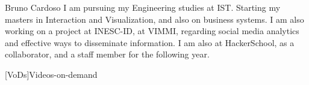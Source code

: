 \documentclass[a4paper,12pt,journal,twoside,compsoc]{PPIEEEtran}
\begin{document}
\begin{IEEEbiography}{Bruno Cardoso}
I am pursuing my Engineering studies at \ac{IST}. Starting my masters in Interaction and Visualization, and also on business systems. I am also working on a project at INESC-ID, at VIMMI, regarding social media analytics and effective ways to disseminate information. I am also at HackerSchool, as a collaborator, and a staff member for the following year.
\end{IEEEbiography}



	[VoDs]{Videos-on-demand}
	
\end{document}
